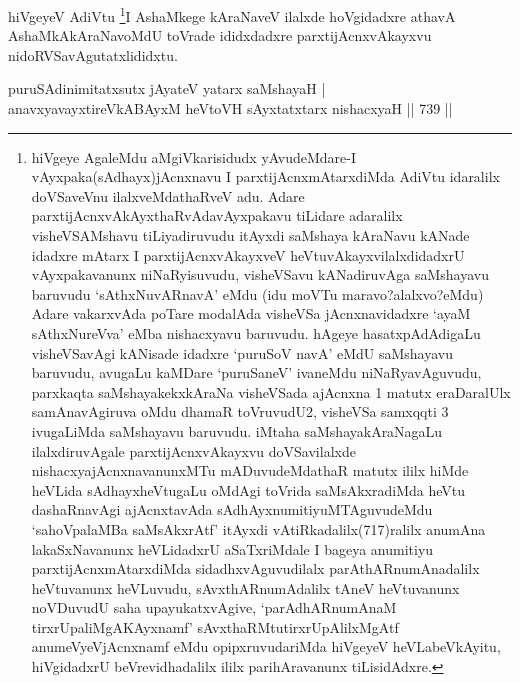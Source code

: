 \begin{artha}
hiVgeyeV AdiVtu \footnote{hiVgeye AgaleMdu aMgiVkarisidudx yAvudeMdare-I vAyxpaka(sAdhayx)jAcnxnavu I parxtijAcnxmAtarxdiMda AdiVtu idaralilx doVSaveVnu ilalxveMdathaRveV adu. Adare parxtijAcnxvAkAyxthaRvAdavAyxpakavu tiLidare adaralilx visheVSAMshavu tiLiyadiruvudu itAyxdi saMshaya kAraNavu kANade idadxre mAtarx I parxtijAcnxvAkayxveV heVtuvAkayxvilalxdidadxrU vAyxpakavanunx niNaRyisuvudu, visheVSavu kANadiruvAga saMshayavu baruvudu `sAthxNuvARnavA' eMdu (idu moVTu maravo?alalxvo?eMdu) Adare vakarxvAda poTare modalAda visheVSa jAcnxnavidadxre `ayaM sAthxNureVva' eMba nishacxyavu baruvudu. hAgeye hasatxpAdAdigaLu visheVSavAgi kANisade idadxre `puruSoV navA' eMdU saMshayavu baruvudu, avugaLu kaMDare `puruSaneV' ivaneMdu niNaRyavAguvudu, parxkaqta saMshayakekxkAraNa visheVSada ajAcnxna 1 matutx eraDaralUlx samAnavAgiruva oMdu dhamaR toVruvudU2, visheVSa samxqqti 3 ivugaLiMda saMshayavu baruvudu. iMtaha saMshayakAraNagaLu ilalxdiruvAgale parxtijAcnxvAkayxvu doVSavilalxde nishacxyajAcnxnavanunxMTu mADuvudeMdathaR matutx ililx hiMde heVLida sAdhayxheVtugaLu oMdAgi toVrida saMsAkxradiMda heVtu dashaRnavAgi ajAcnxtavAda sAdhAyxnumitiyuMTAguvudeMdu `sahoVpalaMBa saMsAkxrAtf' itAyxdi vAtiRkadalilx(717)ralilx anumAna lakaSxNavanunx heVLidadxrU aSaTxriMdale I bageya anumitiyu parxtijAcnxmAtarxdiMda sidadhxvAguvudilalx parAthARnumAnadalilx heVtuvanunx heVLuvudu, sAvxthARnumAdalilx tAneV heVtuvanunx noVDuvudU saha upayukatxvAgive, `parAdhARnumAnaM tirxrUpaliMgAKAyxnamf' sAvxthaRMtutirxrUpAlilxMgAtf anumeVyeVjAcnxnamf eMdu opipxruvudariMda hiVgeyeV heVLabeVkAyitu, hiVgidadxrU beVrevidhadalilx ililx parihAravanunx tiLisidAdxre.}I AshaMkege kAraNaveV ilalxde hoVgidadxre athavA AshaMkAkAraNavoMdU toVrade ididxdadxre parxtijAcnxvAkayxvu nidoRVSavAgutatxlididxtu.
\end{artha}


\begin{shl}
puruSAdinimitatxsutx jAyateV yatarx saMshayaH | \\
anavxyavayxtireVkABAyxM heVtoVH sAyxtatxtarx nishacxyaH \hfill||  739 ||  
\end{shl}

